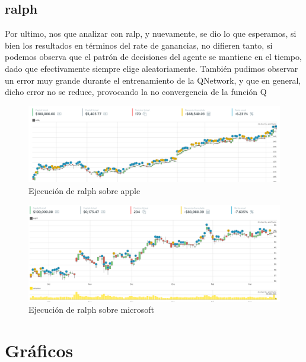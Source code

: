 \subsection{ralph}
Por ultimo, nos que analizar con ralp, y nuevamente, se dio lo que esperamos, si bien los resultados en términos del rate de ganancias, no difieren tanto, si podemos observa que el patrón de decisiones del agente se mantiene en el tiempo, dado que efectivamente siempre elige aleatoriamente. También pudimos observar un error muy grande durante el entrenamiento de la QNetwork, y que en general, dicho error no se reduce, provocando la no convergencia de la función Q

\begin{figure}[h!]
	\includegraphics[scale=0.4]{imagenes/lenny_appl_ex1_1.png}
	\caption{Ejecución de ralph sobre apple}
\end{figure}

\begin{figure}[h!]
	\includegraphics[scale=0.4]{imagenes/lenny_msft_ex1_1.png}
	\caption{Ejecución de ralph sobre microsoft}
\end{figure}

\section{Gráficos}

